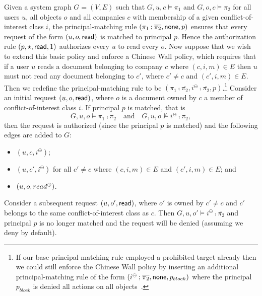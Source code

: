 \documentclass{article}
\newcommand{\interesta}{\ensuremath{i^\oplus}}
\newcommand{\interestb}{\ensuremath{i^\ominus}}
\begin{document}
Given a system graph $G = (V,E)$ such that $G,u,c \models \pi_1$ and $G,o,c \models \pi_2$ for all users $u$, all objects $o$ and all companies $c$ with membership of a given conflict-of-interest class $i$, the principal-matching rule $(\pi_1 \mathbin{;} \overline{\pi_2},\mathsf{none},p)$ ensures that every request of the form $(u,o,\textsf{read})$ is matched to principal $p$.
Hence the authorization rule $(p,\star,\textsf{read},1)$ authorizes every $u$ to read every $o$.
Now suppose that we wish to extend this basic policy and enforce a Chinese Wall policy, which requires that if a user $u$ reads a document belonging to company $c$ where $(c, i, m) \in E$ then $u$ must not read any document belonging to $c'$, where $c' \ne c$ and $(c', i, m) \in E$.
Then we redefine the principal-matching rule to be $(\pi_1 \comp \overline{\pi_2}, \interestb \comp \overline{\pi_2},p)$.\footnote{If our base principal-matching rule employed a prohibited target already then we could still enforce the Chinese Wall policy by inserting an additional principal-matching rule of the form $(\interestb \comp \overline{\pi_2},\none,p_{block})$ where the principal $p_{block}$ is denied all actions on all objects~\cite{CramptonS14_STM}.}
Consider an initial request $(u,o,\textsf{read})$, where $o$ is a document owned by $c$ a member of conflict-of-interest class $i$.
If principal $p$ is matched, that is
\[
 G,u,o \models \pi_1 \comp \overline{\pi_2}\quad \text{and}\quad G,u,o \not\models \interestb \comp \overline{\pi_2},
\]
then the request is authorized (since the principal $p$ is matched) and the following edges are added to $G$:
\begin{itemize}
 \item $(u,c,\interesta)$;
 \item $(u,c',\interestb)$ for all $c' \ne c$ where $(c,i,m) \in E$ and $(c',i,m) \in E$; and
 \item $(u,o,read^\oplus)$.
\end{itemize}
Consider a subsequent request $(u,o',\textsf{read})$, where $o'$ is owned by $c' \ne c$ and $c'$ belongs to the same conflict-of-interest class as $c$.
Then $G,u,o' \models \interestb \comp \overline{\pi_2}$ and principal $p$ is no longer matched and the request will be denied (assuming we deny by default).
\end{document}
